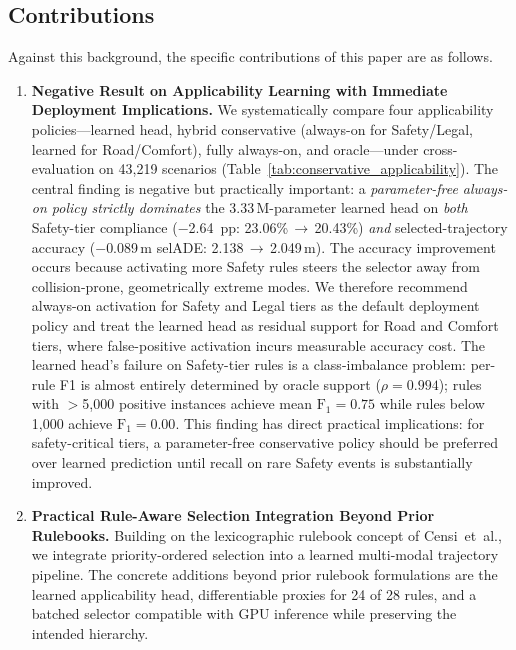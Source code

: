 \subsection{Contributions}
\label{subsec:contributions}

Against this background, the specific contributions of this paper are as follows.

\begin{enumerate}[label=\textbf{C\arabic*},leftmargin=2.5em]

\item \textbf{Negative Result on Applicability Learning with Immediate Deployment Implications.} We systematically compare four applicability policies---learned head, hybrid conservative (always-on for Safety/Legal, learned for Road/Comfort), fully always-on, and oracle---under cross-evaluation on 43{,}219 scenarios (Table~\ref{tab:conservative_applicability}).  The central finding is negative but practically important: a \emph{parameter-free always-on policy strictly dominates} the 3.33\,M-parameter learned head on \emph{both} Safety-tier compliance ($-$2.64~pp: 23.06\%\,$\to$\,20.43\%) \emph{and} selected-trajectory accuracy ($-$0.089\,m selADE: 2.138\,$\to$\,2.049\,m).  The accuracy improvement occurs because activating more Safety rules steers the selector away from collision-prone, geometrically extreme modes.  We therefore recommend always-on activation for Safety and Legal tiers as the default deployment policy and treat the learned head as residual support for Road and Comfort tiers, where false-positive activation incurs measurable accuracy cost.  The learned head's failure on Safety-tier rules is a class-imbalance problem: per-rule F1 is almost entirely determined by oracle support ($\rho{=}0.994$); rules with $>$5{,}000 positive instances achieve mean $\text{F}_1{=}0.75$ while rules below 1{,}000 achieve $\text{F}_1{=}0.00$.  This finding has direct practical implications: for safety-critical tiers, a parameter-free conservative policy should be preferred over learned prediction until recall on rare Safety events is substantially improved.

\item \textbf{Practical Rule-Aware Selection Integration Beyond Prior Rulebooks.} Building on the lexicographic rulebook concept of Censi~et~al., we integrate priority-ordered selection into a learned multi-modal trajectory pipeline.  The concrete additions beyond prior rulebook formulations are the learned applicability head, differentiable proxies for 24 of 28 rules, and a batched selector compatible with GPU inference while preserving the intended hierarchy.


\end{enumerate}
